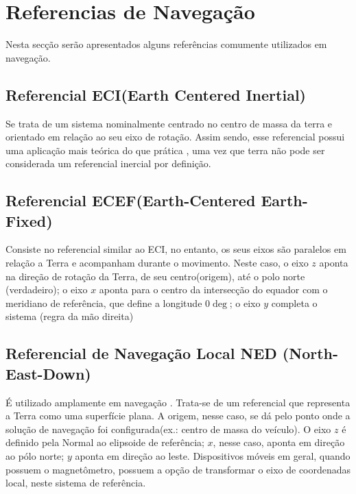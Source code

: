 \section{Referencias de Navegação}

Nesta secção serão apresentados alguns referências comumente utilizados em navegação.

\subsection{Referencial ECI(Earth Centered Inertial)}

Se trata de um sistema nominalmente centrado no centro de massa da terra e orientado em relação ao seu eixo de rotação. Assim sendo, esse referencial possui uma aplicação mais teórica do que prática \citep{mori2013uso}, uma vez que terra não pode ser considerada um referencial inercial por definição.

\subsection{Referencial ECEF(Earth-Centered Earth-Fixed)}

Consiste no referencial similar ao ECI, no entanto, os seus eixos são paralelos em relação a Terra e acompanham durante o movimento. Neste caso, o eixo $z$ aponta na direção de rotação da Terra, de seu centro(origem), até o polo norte (verdadeiro); o eixo $x$ aponta para o centro da intersecção do equador com o meridiano de referência, que define a longitude $0\deg$; o eixo $y$ completa o sistema (regra da mão direita)

\subsection{Referencial de Navegação Local NED (North-East-Down)}

É utilizado amplamente em navegação \citep{mori2013uso}. Trata-se de um referencial que representa a Terra como uma superfície plana. A origem, nesse caso, se dá pelo ponto onde a solução de navegação foi configurada(ex.: centro de massa do veículo). O eixo $z$ é definido pela Normal ao elipsoide de referência; $x$, nesse caso, aponta em direção ao pólo norte; $y$ aponta em direção ao leste. Dispositivos móveis em geral, quando possuem o magnetômetro, possuem a opção de transformar o eixo de coordenadas local, neste sistema de referência.

